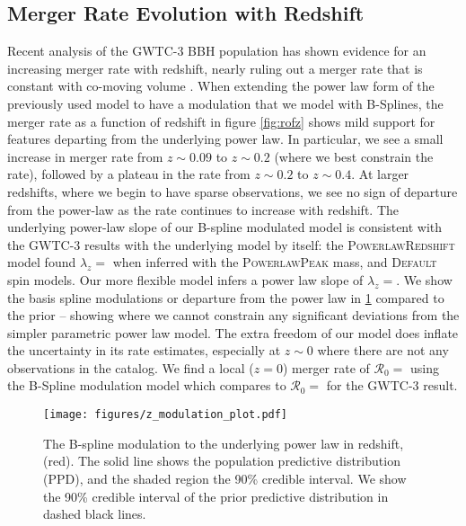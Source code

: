 \subsection{Merger Rate Evolution with Redshift} \label{sec:redshift}

Recent analysis of the GWTC-3 BBH population has shown evidence for an increasing merger rate with redshift, nearly ruling out a merger rate that is 
constant with co-moving volume \citep{Fishbach_2018redshift,o3b_astro_dist}. When extending the power law form of the previously used model to have a modulation 
that we model with B-Splines, the merger rate as a function of redshift in figure \ref{fig:rofz} shows mild support for features departing from the underlying power law. 
In particular, we see a small increase in merger rate from $z\sim0.09$ to $z\sim0.2$ (where we best constrain the rate), followed by a plateau in the rate from $z\sim0.2$ to $z\sim0.4$. 
At larger redshifts, where we begin to have sparse observations, we see no sign of departure from the power-law as the rate continues to increase with redshift. 
The underlying power-law slope of our B-spline modulated model is consistent with the GWTC-3 results with the underlying model by itself: the \textsc{PowerlawRedshift} model 
found $\lambda_z = $\result{$\CIPlusMinus{\macros[PLPeak][lamb]}$} when inferred with the \textsc{PowerlawPeak} mass, and \textsc{Default} spin models. Our more 
flexible model infers a power law slope of $\lambda_z = $\result{$\CIPlusMinus{\macros[BSplineIIDCompSpins][lamb]}$}. We show the basis spline modulations or departure 
from the power law in \ref{fig:z_modulation} compared to the prior -- showing where we cannot constrain any significant deviations from the simpler parametric power law model. 
The extra freedom of our model does inflate the uncertainty in its rate estimates, especially at $z\sim0$ where there are not any observations in the catalog. 
We find a local ($z=0$) merger rate of $\mathcal{R}_0 = $ using the B-Spline modulation model 
which compares to $\mathcal{R}_0 = $ for the GWTC-3 result. 

\begin{figure}[h]
    \texttt{[image: figures/z\_modulation\_plot.pdf]}
    \caption{The B-spline modulation to the underlying power law in redshift, (red). The solid line shows the population predictive distribution (PPD),
    and the shaded region the 90\% credible interval. We show the 90\% credible interval of the prior predictive distribution in dashed black lines.}
    \label{fig:z_modulation}
\end{figure}

